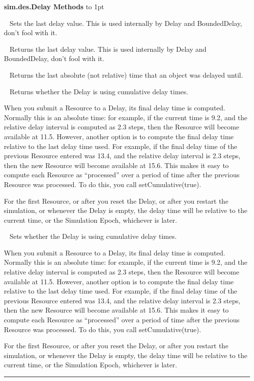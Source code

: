 \documentclass[twoside,10pt]{article}
\newcommand\class[1]{\index{Classes!{#1}}\textsf{#1}}
\newcommand\method[1]{\hbox{\textsf{#1}}}
\newcommand*{\xfill}[1][0pt]{%
	\cleaders
		\hbox to 1pt{\hss
			\raisebox{#1}{\rule{1.2pt}{0.4pt}}%
			\hss}\hfill}
\newenvironment{methods}[1]{
\vspace{1.0em}\noindent\textsf{\textbf{#1 Methods}}\quad \xfill[0.5ex]
\vspace{-0.25em}
\begin{description}
\small}
{\end{description}\hrule\vspace{1.5em}}
\newcommand{\mthd}[1]{\item[{\sf #1}]~\newline}
\begin{document}
\begin{methods}{\class{sim.des.Delay}}
\mthd{protected void setLastDelay(double val)}
Sets the last delay value.  This is used internally by Delay and BoundedDelay, don't fool with it.

\mthd{protected double getLastDelay()}
Returns the last delay value.  This is used internally by Delay and BoundedDelay, don't fool with it.

\mthd{public double getLastDelayTime()}
Returns the last absolute (not relative) time that an object was delayed until.

\mthd{public boolean isCumulative()}
Returns whether the Delay is using cumulative delay times.

When you submit a Resource to a Delay, its final delay time is computed.  Normally this is an absolute time: for example, if the current time is 9.2, and the relative delay interval is computed as 2.3 steps, then the Resource will become available at 11.5.  However, another option is to compute the final delay time relative to the last delay time used.   For example, if the final delay time of the previous Resource entered was 13.4, and the relative delay interval is 2.3 steps, then the new Resource will become available at 15.6.  This makes it easy to compute each Resource as ``processed'' over a period of time after the previous Resource was processed.  To do this, you call \method{setCumulative(true)}.  

For the first Resource, or after you reset the Delay, or after you restart
	the simulation, or whenever the Delay is empty, the delay time will be relative to the current time, or the
	Simulation Epoch, whichever is later.

\mthd{public void setCumulative(boolean val)}
Sets whether the Delay is using cumulative delay times.

When you submit a Resource to a Delay, its final delay time is computed.  Normally this is an absolute time: for example, if the current time is 9.2, and the relative delay interval is computed as 2.3 steps, then the Resource will become available at 11.5.  However, another option is to compute the final delay time relative to the last delay time used.   For example, if the final delay time of the previous Resource entered was 13.4, and the relative delay interval is 2.3 steps, then the new Resource will become available at 15.6.  This makes it easy to compute each Resource as ``processed'' over a period of time after the previous Resource was processed.  To do this, you call \method{setCumulative(true)}.  

For the first Resource, or after you reset the Delay, or after you restart
	the simulation, or whenever the Delay is empty, the delay time will be relative to the current time, or the
	Simulation Epoch, whichever is later.


\end{methods}
\end{document}
